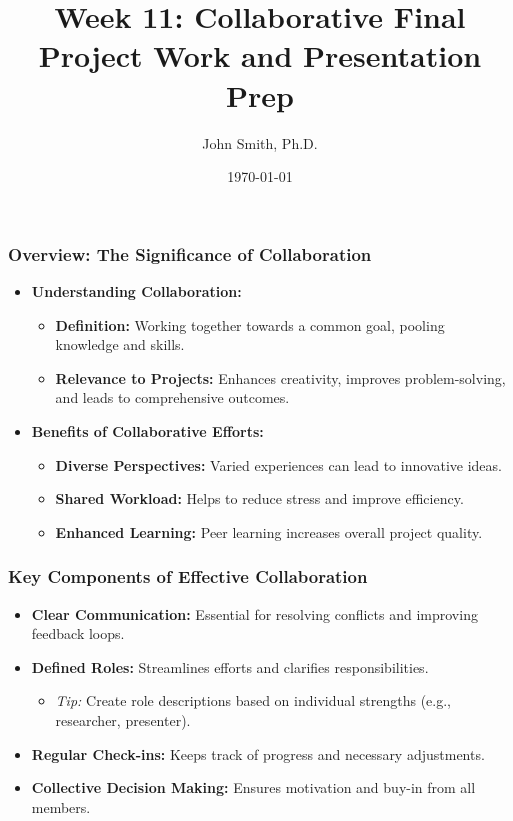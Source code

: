 \documentclass[aspectratio=169]{beamer}
\title[Collaborative Project]{Week 11: Collaborative Final Project Work and Presentation Prep}
\author[John Smith]{John Smith, Ph.D.}
\date{\today}
\begin{document}
\frame{\titlepage}

\begin{frame}[fragile]
    \titlepage
\end{frame}

\begin{frame}[fragile]
    \frametitle{Overview: The Significance of Collaboration}
    
    \begin{itemize}
        \item \textbf{Understanding Collaboration:}
            \begin{itemize}
                \item \textbf{Definition:} Working together towards a common goal, pooling knowledge and skills.
                \item \textbf{Relevance to Projects:} Enhances creativity, improves problem-solving, and leads to comprehensive outcomes.
            \end{itemize}

        \item \textbf{Benefits of Collaborative Efforts:}
            \begin{itemize}
                \item \textbf{Diverse Perspectives:} Varied experiences can lead to innovative ideas.
                \item \textbf{Shared Workload:} Helps to reduce stress and improve efficiency.
                \item \textbf{Enhanced Learning:} Peer learning increases overall project quality.
            \end{itemize}
    \end{itemize}
\end{frame}

\begin{frame}[fragile]
    \frametitle{Key Components of Effective Collaboration}

    \begin{itemize}
        \item \textbf{Clear Communication:} Essential for resolving conflicts and improving feedback loops.
        \item \textbf{Defined Roles:} Streamlines efforts and clarifies responsibilities.
            \begin{itemize}
                \item \textit{Tip:} Create role descriptions based on individual strengths (e.g., researcher, presenter).
            \end{itemize}
        \item \textbf{Regular Check-ins:} Keeps track of progress and necessary adjustments.
        \item \textbf{Collective Decision Making:} Ensures motivation and buy-in from all members.
    \end{itemize}
\end{frame}
\end{document}
